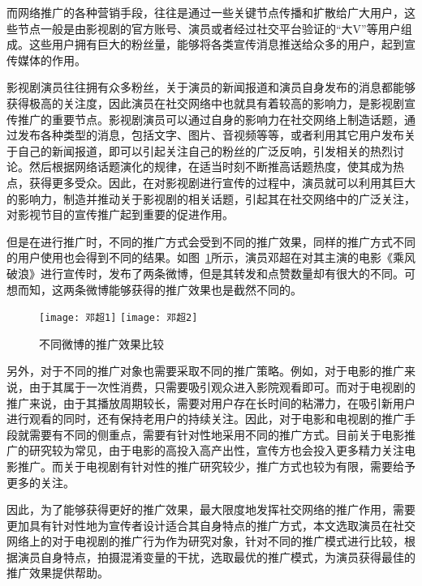 而网络推广的各种营销手段，往往是通过一些关键节点传播和扩散给广大用户，这些节点一般是由影视剧的官方账号、演员或者经过社交平台验证的“大V”等用户组成。这些用户拥有巨大的粉丝量，能够将各类宣传消息推送给众多的用户，起到宣传媒体的作用\cite{kwak2010twitter}。

影视剧演员往往拥有众多粉丝，关于演员的新闻报道和演员自身发布的消息都能够获得极高的关注度，因此演员在社交网络中也就具有着较高的影响力\cite{shafiq2013identifying}，是影视剧宣传推广的重要节点。影视剧演员可以通过自身的影响力在社交网络上制造话题，通过发布各种类型的消息，包括文字、图片、音视频等等，或者利用其它用户发布关于自己的新闻报道，即可以引起关注自己的粉丝的广泛反响，引发相关的热烈讨论。然后根据网络话题演化的规律\cite{he2009detecting}，在适当时刻不断推高话题热度，使其成为热点，获得更多受众。因此，在对影视剧进行宣传的过程中，演员就可以利用其巨大的影响力，制造并推动关于影视剧的相关话题，引起其在社交网络中的广泛关注，对影视节目的宣传推广起到重要的促进作用。

但是在进行推广时，不同的推广方式会受到不同的推广效果，同样的推广方式不同的用户使用也会得到不同的结果。如图~\ref{邓超}所示，演员邓超在对其主演的电影《乘风破浪》进行宣传时，发布了两条微博，但是其转发和点赞数量却有很大的不同。可想而知，这两条微博能够获得的推广效果也是截然不同的。

\begin{figure}[h]
  \centering%
    {\texttt{[image: 邓超1]}}
      {\texttt{[image: 邓超2]}}
  \caption{不同微博的推广效果比较}
  \label{邓超}
\end{figure}

另外，对于不同的推广对象也需要采取不同的推广策略。例如，对于电影的推广来说，由于其属于一次性消费，只需要吸引观众进入影院观看即可。而对于电视剧的推广来说，由于其播放周期较长，需要对用户存在长时间的粘滞力，在吸引新用户进行观看的同时，还有保持老用户的持续关注。因此，对于电影和电视剧的推广手段就需要有不同的侧重点，需要有针对性地采用不同的推广方式。目前关于电影推广的研究较为常见，由于电影的高投入高产出性，宣传方也会投入更多精力关注电影推广。而关于电视剧有针对性的推广研究较少，推广方式也较为有限，需要给予更多的关注。

因此，为了能够获得更好的推广效果，最大限度地发挥社交网络的推广作用，需要更加具有针对性地为宣传者设计适合其自身特点的推广方式，本文选取演员在社交网络上的对于电视剧的推广行为作为研究对象，针对不同的推广模式进行比较，根据演员自身特点，拍摄混淆变量的干扰，选取最优的推广模式，为演员获得最佳的推广效果提供帮助。


